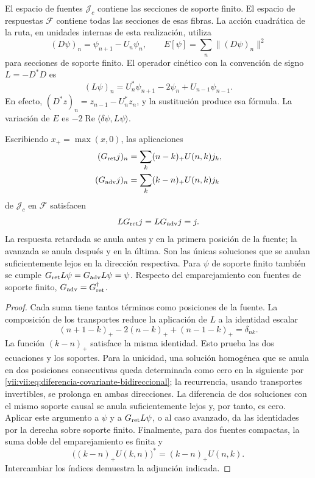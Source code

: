 El espacio de fuentes \(\mathcal J_c\) contiene las secciones de soporte
finito. El espacio de respuestas \(\mathcal F\) contiene todas las
secciones de esas fibras. La acción cuadrática de la ruta, en unidades
internas de esta realización, utiliza
\[
 (D\psi)_n=\psi_{n+1}-U_n\psi_n,\qquad
 E[\psi]=\sum_n\|(D\psi)_n\|^2
\]
para secciones de soporte finito. El operador cinético con la convención
de signo \(L=-D^*D\) es
\begin{equation}
 (L\psi)_n=U_n^*\psi_{n+1}-2\psi_n+U_{n-1}\psi_{n-1}.
 \label{vii:vii:eq:diferencia-covariante-bidireccional}
\end{equation}
En efecto, \((D^*z)_n=z_{n-1}-U_n^*z_n\), y la sustitución produce
esa fórmula. La variación de \(E\) es
\(-2\operatorname{Re}\langle\delta\psi,L\psi\rangle\).

\begin{theorem}
\label{vii:vii:thm:green-cronologico}
Escribiendo \(x_+=\max(x,0)\), las aplicaciones
\begin{align}
 (G_{\rm ret}j)_n&=\sum_k(n-k)_+U(n,k)j_k,\label{vii:vii:eq:green-ret-cronologico}\\
 (G_{\rm adv}j)_n&=\sum_k(k-n)_+U(n,k)j_k\label{vii:vii:eq:green-adv-cronologico}
\end{align}
de \(\mathcal J_c\) en \(\mathcal F\) satisfacen
\[
 LG_{\rm ret}j=LG_{\rm adv}j=j.
\]
La respuesta retardada se anula antes y en la primera posición de la
fuente; la avanzada se anula después y en la última. Son las únicas
soluciones que se anulan suficientemente lejos en la dirección respectiva.
Para \(\psi\) de soporte finito también se cumple
\(G_{\rm ret}L\psi=G_{\rm adv}L\psi=\psi\).
Respecto del emparejamiento con fuentes de soporte finito,
\(G_{\rm adv}=G_{\rm ret}^{\dagger}\).
\end{theorem}
\begin{proof}
Cada suma tiene tantos términos como posiciones de la fuente.
La composición de los transportes reduce la aplicación de \(L\) a
la identidad escalar
\[
 (n+1-k)_+-2(n-k)_++(n-1-k)_+=\delta_{nk}.
\]
La función \((k-n)_+\) satisface la misma identidad. Esto prueba
las dos ecuaciones y los soportes. Para la unicidad, una solución
homogénea que se anula en dos posiciones consecutivas queda determinada
como cero en la siguiente por \eqref{vii:vii:eq:diferencia-covariante-bidireccional};
la recurrencia, usando transportes invertibles, se prolonga en ambas
direcciones. La diferencia de dos soluciones con el mismo soporte causal
se anula suficientemente lejos y, por tanto, es cero.
Aplicar este argumento a \(\psi\) y a \(G_{\rm ret}L\psi\), o al
caso avanzado, da las identidades por la derecha sobre soporte finito.
Finalmente, para dos fuentes compactas, la suma doble del emparejamiento
es finita y
\[
 \bigl((k-n)_+U(k,n)\bigr)^*=(k-n)_+U(n,k).
\]
Intercambiar los índices demuestra la adjunción indicada.
\end{proof}

